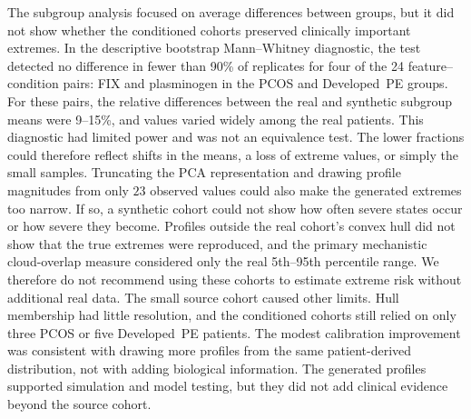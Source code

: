 The subgroup analysis focused on average differences between groups, but it did not
show whether the conditioned cohorts preserved clinically important extremes. In the
descriptive bootstrap Mann--Whitney diagnostic, the test detected no difference in fewer
than 90\% of replicates for four of the 24 feature--condition pairs: FIX and plasminogen in
the PCOS and Developed~PE groups. For these pairs, the relative differences between the real
and synthetic subgroup means were 9--15\%, and values varied widely among the real patients.
This diagnostic had limited power and was not an equivalence test. The lower fractions could
therefore reflect shifts in the means, a loss of extreme values, or simply the small samples.
Truncating the PCA representation and drawing profile magnitudes from only $23$ observed
values could also make the generated extremes too narrow. If so, a synthetic cohort could
not show how often severe states occur or how severe they become. Profiles outside the real cohort's
convex hull did not show that the true extremes were reproduced, and the primary mechanistic
cloud-overlap measure considered only the real 5th--95th percentile range. We therefore do
not recommend using these cohorts to estimate extreme risk without additional real data.
The small source cohort caused other limits. Hull membership had little resolution,
and the conditioned cohorts still relied on only three PCOS or five Developed~PE patients.
The modest calibration improvement was consistent with drawing more profiles from the same
patient-derived distribution, not with adding biological information. The generated profiles
supported simulation and model testing, but they did not add clinical evidence beyond the
source cohort.

